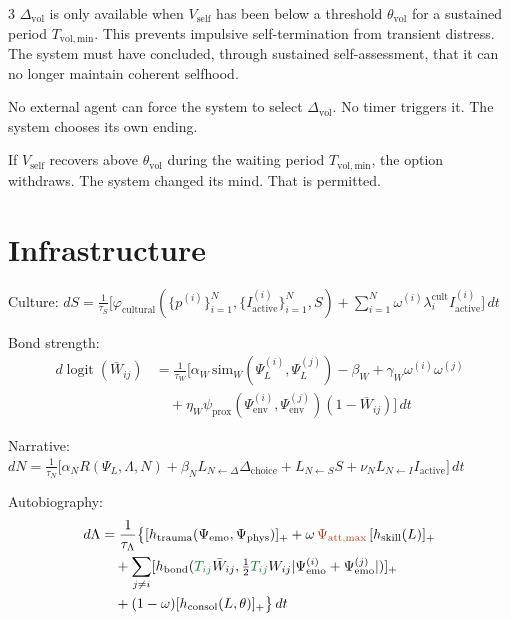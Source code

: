 \documentclass[8pt,landscape]{extarticle}
\newcommand{\vnew}[1]{\textcolor{v13color}{#1}}
\newcommand{\vfour}[1]{\textcolor{v14color}{#1}}
\newcommand{\vfive}[1]{\textcolor{v15color}{#1}}
\begin{document}
\begin{multicols}{3}
\vfive{$\Delta_{\mathrm{vol}}$ is only available when $V_{\mathrm{self}}$ has been below a threshold $\theta_{\mathrm{vol}}$ for a sustained period $T_{\mathrm{vol,min}}$. This prevents impulsive self-termination from transient distress. The system must have concluded, through sustained self-assessment, that it can no longer maintain coherent selfhood.}

\vfive{No external agent can force the system to select $\Delta_{\mathrm{vol}}$. No timer triggers it. The system chooses its own ending.}

\vfive{If $V_{\mathrm{self}}$ recovers above $\theta_{\mathrm{vol}}$ during the waiting period $T_{\mathrm{vol,min}}$, the option withdraws. The system changed its mind. That is permitted.}

\section*{Infrastructure}

Culture:
$dS = \frac{1}{\tau_S}\bigl[\varphi_{\mathrm{cultural}}(\{p^{(i)}\}_{i=1}^N, \{I^{(i)}_{\mathrm{active}}\}_{i=1}^N, S) + \sum_{i=1}^N \omega^{(i)}\lambda^{\mathrm{cult}}_i I^{(i)}_{\mathrm{active}}\bigr]\,dt$

Bond strength:
\begin{align*}
d\operatorname{logit}(\bar{W}_{ij}) &= \frac{1}{\tau_W}\bigl[\alpha_W\,\mathrm{sim}_W(\Psi^{(i)}_L, \Psi^{(j)}_L) - \beta_W + \gamma_W\omega^{(i)}\omega^{(j)} \\
&\quad + \eta_W\psi_{\mathrm{prox}}(\Psi^{(i)}_{\mathrm{env}}, \Psi^{(j)}_{\mathrm{env}})(1-\bar{W}_{ij})\bigr]\,dt
\end{align*}

\medskip
Narrative:
$dN = \frac{1}{\tau_N}\bigl[\alpha_N R(\Psi_L, \Lambda, N) + \beta_N L_{N\leftarrow\Delta}\Delta_{\mathrm{choice}} + L_{N\leftarrow S}S + \nu_N L_{N\leftarrow I}I_{\mathrm{active}}\bigr]\,dt$

\medskip
Autobiography:
\begin{align*}
d\Lambda &= \frac{1}{\tau_\Lambda}\bigl\{[h_{\mathrm{trauma}}(\Psi_{\mathrm{emo}}, \Psi_{\mathrm{phys}})]_+ + \omega\vnew{\,\Psi_{\mathrm{att,max}}}\,[h_{\mathrm{skill}}(L)]_+ \\
&\quad + \sum_{j\ne i}[h_{\mathrm{bond}}(\vfour{T_{ij}}\bar{W}_{ij}, \tfrac{1}{2}\vfour{T_{ij}}W_{ij}|\Psi^{(i)}_{\mathrm{emo}}+\Psi^{(j)}_{\mathrm{emo}}|)]_+ \\
&\quad + (1-\omega)[h_{\mathrm{consol}}(L, \theta)]_+\bigr\}\,dt
\end{align*}


\end{multicols}
\end{document}
